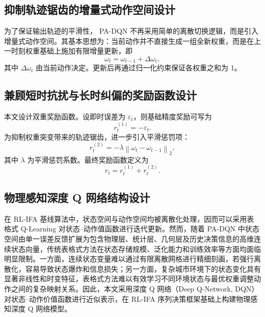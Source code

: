 \subsection{抑制轨迹锯齿的增量式动作空间设计}
\label{subsec:3_4_2}

为了保证输出轨迹的平滑性， PA-DQN 不再采用简单的离散切换逻辑，而是引入增量式动作空间。其基本思想为：当前动作并不直接生成一组全新权重，而是在上一时刻权重基础上施加有限增量更新，即
\begin{equation}
\omega_t = \omega_{t-1} + \Delta \omega_t,
\label{eq:3_14_incremental_weight}
\end{equation}
其中 \(\Delta \omega_t\) 由当前动作决定。更新后再通过归一化约束保证各权重之和为 1。

\subsection{兼顾短时抗扰与长时纠偏的奖励函数设计}
\label{subsec:3_4_3}

本文设计双重奖励函数。设即时误差为 \(\varepsilon_t\)，则基础精度奖励可写为
\begin{equation}
r_t^{(1)}=-\varepsilon_t.
\label{eq:3_15_reward_error}
\end{equation}
为抑制权重突变带来的轨迹锯齿，进一步引入平滑惩罚项：
\begin{equation}
r_t^{(2)}=-\lambda \left\|\omega_t-\omega_{t-1}\right\|_2,
\label{eq:3_16_reward_smooth}
\end{equation}
其中 \(\lambda\) 为平滑惩罚系数。最终奖励函数定义为
\begin{equation}
r_t = r_t^{(1)} + r_t^{(2)}.
\label{eq:3_17_reward_total}
\end{equation}

\subsection{物理感知深度 Q 网络结构设计}
\label{subsec:3_4_4}

在 RL-IFA 基线算法中，状态空间与动作空间均被离散化处理，因而可以采用表格式 Q-Learning 对状态--动作值函数进行迭代更新。然而，随着 PA-DQN 中状态空间由单一误差反馈扩展为包含物理层、统计层、几何层及历史决策信息的高维连续状态向量，传统表格式方法在状态存储规模、泛化能力和训练效率等方面均面临明显限制。一方面，连续状态变量难以通过有限离散网格进行精细刻画，若强行离散化，容易导致状态爆炸和信息损失；另一方面，复杂城市环境下的状态变化具有显著非线性和时变特征，表格式方法难以有效学习不同环境状态与最优权重调整动作之间的复杂映射关系。因此，本文采用深度 Q 网络（Deep Q-Network, DQN）对状态--动作价值函数进行近似表示，在 RL-IFA 序列决策框架基础上构建物理感知深度 Q 网络模型。

